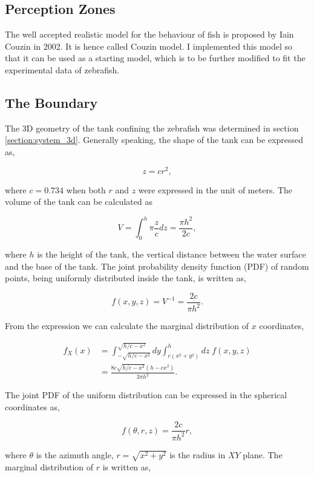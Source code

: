\documentclass[11pt,twoside]{report}
\begin{document}
\subsection{Perception Zones}

The well accepted realistic model for the behaviour of fish is proposed by Iain Couzin in 2002. It is hence called Couzin model. I implemented this model so that it can be used as a starting model, which is to be further modified to fit the experimental data of zebrafish.

\subsection{The Boundary}

The 3D geometry of the tank confining the zebrafish was determined in section \ref{section:system_3d}. Generally speaking, the shape of the tank can be expressed as,

$$
z = c r^2,
$$

\noindent where $c=0.734$ when both $r$ and $z$ were expressed in the unit of meters. The volume of the tank can be calculated as

$$
V = \int_{0}^{h}{\pi \frac{z}{c}} dz = \frac{\pi h^2}{2 c},
$$

\noindent where $h$ is the height of the tank, the vertical distance between the water surface and the base of the tank. The joint probability density function (PDF) of random points, being uniformly distributed inside the tank, is written as,

$$
f(x, y, z) = V^{-1} = \frac{2c}{\pi h^2}.
$$

\noindent From the expression we can calculate the marginal distribution of $x$ coordinates,

$$
\begin{aligned}
f_X(x) &= \int_{-\sqrt{h/c - x^2}}^{\sqrt{h/c - x^2}} dy
\int_{c(x^2 + y^2)}^{h} dz \; f(x, y, z) \\[1em]
&= \frac{8 c \sqrt{h/c-x^2} \left(h - c x^2 \right)}{3 \pi h^2}.
\end{aligned}
$$

\noindent The joint PDF of the uniform distribution can be expressed in the spherical coordinates as,

$$
f(\theta, r, z) = \frac{2c}{\pi h^2} r,
$$

\noindent where $\theta$ is the azimuth angle, $r = \sqrt{x^2 + y^2}$ is the radius in $XY$ plane. The marginal distribution of $r$ is written as,
\end{document}
